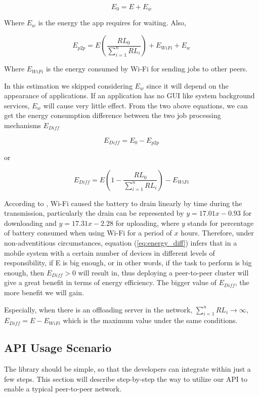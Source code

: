 \documentclass{sig-alternate}[10pt]
\begin{document}
$$E_{0} = E + E_{w}$$

Where $E_{w}$ is the energy the app requires for waiting. Also, 

$$E_{p2p} = E(\frac{RL_{0}}{\sum_{i = 1}^{n}{RL_{i}}}) + E_{WiFi} + E_{w}$$ 

Where $E_{WiFi}$ is the energy consumed by Wi-Fi for sending jobs to other peers.

In this estimation we skipped considering $E_{w}$ since it will depend on the appearance of applications. If an application has no GUI like system background services, $E_{w}$ will cause very little effect. From the two above equations, we can get the energy consumption difference between the two job processing mechanisms $E_{Diff}$ 

$$E_{Diff} = E_{0} - E_{p2p}$$ 

or 

\begin{equation}
\label{eq:energy_diff}
E_{Diff} = E(1 - \frac{RL_{0}}{\sum_{i=1}^{n}{RL_{i}}}) - E_{WiFi}
\end{equation}

According to \cite{wifi_energy}, Wi-Fi caused the battery to drain linearly by time during the transmission, particularly the drain can be represented by $y = 17.01x - 0.93$ for downloading and $y = 17.31x - 2.28$ for uploading, where $y$ stands for percentage of battery consumed when using Wi-Fi for a period of $x$ hours. Therefore, under non-adventitious circumstances, equation (\ref{eq:energy_diff}) infers that in a mobile system with a certain number of devices in different levels of responsibility, if E is big enough, or in other words, if the task to perform is big enough, then $E_{Diff} > 0$ will result in, thus deploying a peer-to-peer cluster will give a great benefit in terms of energy efficiency. The bigger value of $E_{Diff}$, the more benefit we will gain. 

Especially, when there is an offloading server in the network, $\sum_{i=1}^{n}{RL_{i}} \rightarrow \infty$, $E_{Diff} = E - E_{WiFi}$ which is the maximum value under the same conditions.

\subsection{API Usage Scenario}

The library should be simple, so that the developers can integrate within just a few steps. This section will describe step-by-step the way to utilize our API to enable a typical peer-to-peer network.
\end{document}
